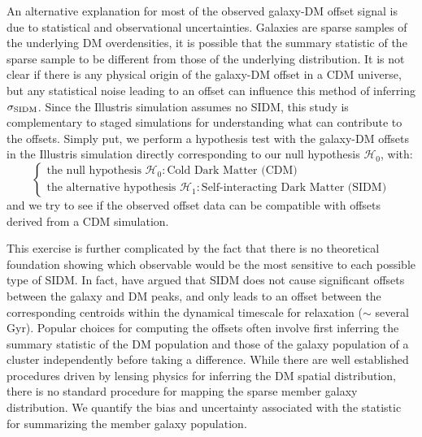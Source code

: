 An alternative explanation for most of the observed galaxy-DM offset signal is due to 
statistical and observational uncertainties. Galaxies are
sparse samples of the underlying DM overdensities, it is possible that the 
summary statistic of the sparse sample to be different from those of the 
underlying distribution. It is not clear if there is any physical
origin of the galaxy-DM offset in a CDM universe, 
but any statistical noise leading to an offset can influence this method of 
inferring $\sigma_{\rm SIDM}$. 
Since the Illustris simulation assumes no SIDM, this study is complementary to 
staged simulations for understanding what can contribute to the offsets.
Simply put, we perform a hypothesis test with the galaxy-DM offsets in
the Illustris simulation directly corresponding to our null hypothesis
$\mathcal{H}_0$, with: 
\begin{equation}
\begin{cases}
	\text{the null hypothesis }\mathcal{H}_0: \text{Cold Dark Matter (CDM)} \\
	\text{the alternative hypothesis }\mathcal{H}_1: \text{Self-interacting Dark
	Matter (SIDM)} 
\end{cases}
\end{equation}
and we try to see if the observed offset data can be compatible with offsets
derived from a CDM simulation. 


This exercise is further complicated by the fact that there is no theoretical
foundation showing which observable would be the most sensitive to each
possible type of SIDM. In fact, \cite{Kahlhoefer14} have argued that SIDM 
does not cause
significant offsets between the galaxy and DM peaks, and only leads to an offset
between the corresponding centroids within the dynamical timescale for
relaxation ($\sim$ several Gyr). 
Popular choices for computing the offsets often involve first inferring the summary
statistic of the DM population and those of the galaxy population of a cluster
independently before taking a difference.
While there are well established procedures driven by lensing physics for 
inferring the DM spatial distribution, there is no standard procedure for
mapping the sparse member galaxy distribution. 
We quantify the bias and uncertainty associated with the
statistic for summarizing the member galaxy population. 

